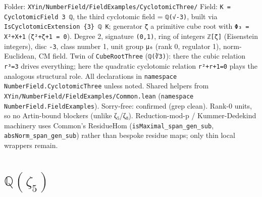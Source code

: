\documentclass[UTF8,a4paper,11pt,fontset=fandol]{ctexart}
\theoremstyle{definition}
\begin{document}
Folder: \texttt{XYin/\allowbreak{}NumberField/\allowbreak{}FieldExamples/\allowbreak{}CyclotomicThree/\allowbreak{}} Field: \texttt{K = CyclotomicField 3 ℚ}, the third cyclotomic field = \texttt{ℚ(√-3)}, built via \texttt{IsCyclotomicExtension \{3\} ℚ K}; generator \texttt{ζ} a primitive cube root with \texttt{Φ₃ = X²+X+1} (\texttt{ζ²+ζ+1 = 0}). Degree 2, signature \texttt{(0,1)}, ring of integers \texttt{ℤ[ζ]} (Eisenstein integers), disc \texttt{-3}, class number 1, unit group \texttt{μ₆} (rank 0, regulator 1), norm-Euclidean, CM field. Twin of \texttt{CubeRootThree} (\texttt{ℚ(∛3)}): there the cubic relation \texttt{r³=3} drives everything; here the quadratic cyclotomic relation \texttt{r²+r+1=0} plays the analogous structural role. All declarations in \texttt{namespace NumberField.\allowbreak{}CyclotomicThree} unless noted. Shared helpers from \texttt{XYin/\allowbreak{}NumberField/\allowbreak{}FieldExamples/\allowbreak{}Common.\allowbreak{}lean} (\texttt{namespace NumberField.\allowbreak{}FieldExamples}). Sorry-free: confirmed (grep clean). Rank-0 units, so no Artin-bound blockers (unlike ζ₅/ζ₈). Reduction-mod-p / Kummer-Dedekind machinery uses Common's ResidueHom (\texttt{isMaximal\_\allowbreak{}span\_\allowbreak{}gen\_\allowbreak{}sub}, \texttt{absNorm\_\allowbreak{}span\_\allowbreak{}gen\_\allowbreak{}sub}) rather than bespoke residue maps; only thin local wrappers remain.


\section{\(\mathbb Q(\zeta_5)\)}
\end{document}
